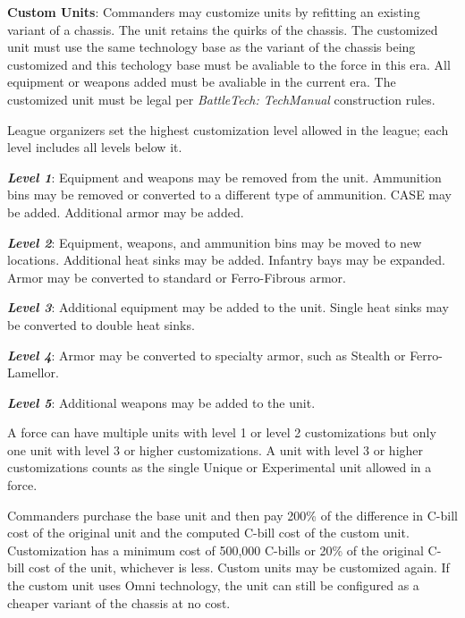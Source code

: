 \item {\bfseries Custom Units}: Commanders may customize units by refitting an existing variant of a chassis.
The unit retains the quirks of the chassis.
The customized unit must use the same technology base as the variant of the chassis being customized and this techology base must be avaliable to the force in this era.
All equipment or weapons added must be avaliable in the current era.
The customized unit must be legal per \emph{BattleTech: TechManual} construction rules.

League organizers set the highest customization level allowed in the league; each level includes all levels below it.

\begin{description}

\item \emph{\bfseries Level 1}: Equipment and weapons may be removed from the unit.
Ammunition bins may be removed or converted to a different type of ammunition.
CASE may be added.
Additional armor may be added.

\item \emph{\bfseries Level 2}: Equipment, weapons, and ammunition bins may be moved to new locations.
Additional heat sinks may be added.
Infantry bays may be expanded.
Armor may be converted to standard or Ferro-Fibrous armor.

\item \emph{\bfseries Level 3}: Additional equipment may be added to the unit.
Single heat sinks may be converted to double heat sinks.

\item \emph{\bfseries Level 4}: Armor may be converted to specialty armor, such as Stealth or Ferro-Lamellor.

\item \emph{\bfseries Level 5}: Additional weapons may be added to the unit.

\end{description}

A force can have multiple units with level 1 or level 2 customizations but only one unit with level 3 or higher customizations.
A unit with level 3 or higher customizations counts as the single Unique or Experimental unit allowed in a force.

Commanders purchase the base unit and then pay 200\% of the difference in C-bill cost of the original unit and the computed C-bill cost of the custom unit.
Customization has a minimum cost of 500,000 C-bills or 20\% of the original C-bill cost of the unit, whichever is less.
Custom units may be customized again.
If the custom unit uses Omni technology, the unit can still be configured as a cheaper variant of the chassis at no cost.

